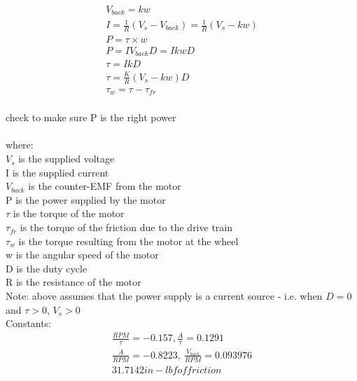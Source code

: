 \documentclass{report}
\begin{document}
\begin{gather*}
V_{back} = k w \\
I = \frac{1}{R} (V_{s} - V_{back}) = \frac{1}{R} (V_{s} - k w) \\
P = \tau \times w \\
P = I V_{back} D = I k w D \\
\tau = I k D \\
\tau = \frac{K}{R} \left( V_{s} - k w \right) D \\
\tau _{w} = \tau - \tau _{fr} \\
\end{gather*}

check to make sure P is the right power\\
\\
where: \\
$V_s$ is the supplied voltage \\
I is the supplied current \\
$V_{back}$ is the counter-EMF from the motor \\
P is the power supplied by the motor \\
$\tau$ is the torque of the motor \\
$\tau _{fr}$ is the torque of the friction due to the drive train \\
$ \tau _{w} $ is the torque resulting from the motor at the wheel \\
w is the angular speed of the motor \\
D is the duty cycle \\
R is the resistance of the motor \\

Note: above assumes that the power supply is a current source - i.e. when $D = 0$ and $\tau > 0$, $V_s > 0$ \\

Constants:
\begin{gather*}
\frac{RPM}{\tau} = -0.157, \frac{A}{\tau} = 0.1291 \\
\frac{A}{RPM} = -0.8223, \ \frac{V_{back}}{RPM} = 0.093976 \\
31.7142 in-lbf of friction \\
\end{gather*}
\end{document}
